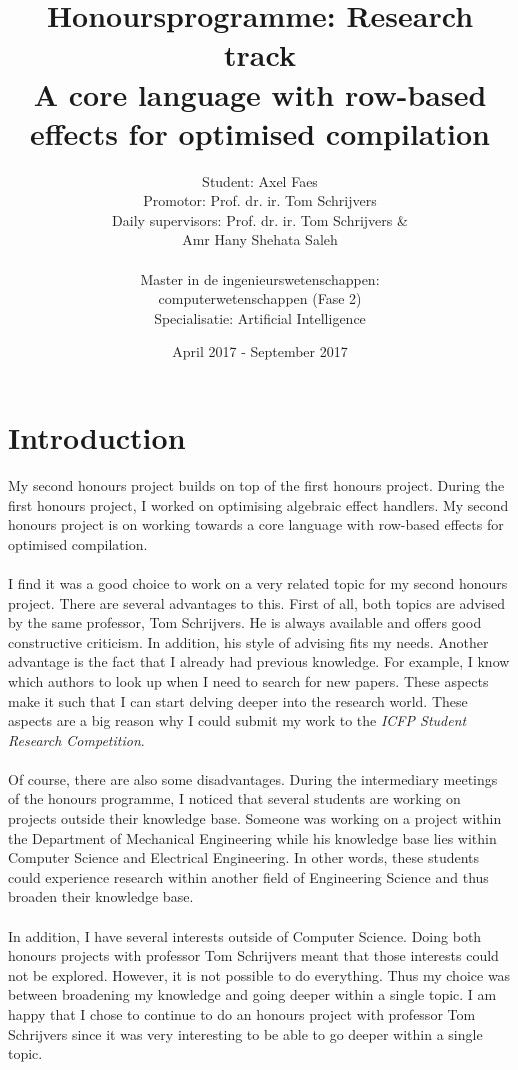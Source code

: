 \documentclass[notitlepage]{article}
\title{\vspace{-2cm}Honoursprogramme: Research track \\\mbox{}{A core language with row-based effects for optimised compilation}}
\author{Student: Axel Faes\\{ Promotor: Prof. dr. ir. Tom Schrijvers}\\{Daily supervisors:  Prof. dr. ir. Tom Schrijvers \&\\ Amr Hany Shehata Saleh}\\\mbox{}\\{Master in de ingenieurswetenschappen: \\computerwetenschappen (Fase 2)}\\{Specialisatie: Artificial Intelligence}}
\date{April 2017 - September 2017}
\begin{document}
\maketitle

\section{Introduction}
My second honours project builds on top of the first honours project. During the first honours project, I worked on optimising algebraic effect handlers. My second honours project is on working towards a core language with row-based effects for optimised compilation. \\
\\
I find it was a good choice to work on a very related topic for my second honours project. There are several advantages to this. First of all, both topics are advised by the same professor, Tom Schrijvers. He is always available and offers good constructive criticism. In addition, his style of advising fits my needs. Another advantage is the fact that I already had previous knowledge. For example, I know which authors to look up when I need to search for new papers. These aspects make it such that I can start delving deeper into the research world. These aspects are a big reason why I could submit my work to the \textit{ICFP Student Research Competition}. \\
\\
Of course, there are also some disadvantages. During the intermediary meetings of the honours programme, I noticed that several students are working on projects outside their knowledge base. Someone was working on a project within the Department of Mechanical Engineering while his knowledge base lies within Computer Science and Electrical Engineering. In other words, these students could experience research within another field of Engineering Science and thus broaden their knowledge base. \\
\\
In addition, I have several interests outside of Computer Science. Doing both honours projects with professor Tom Schrijvers meant that those interests could not be explored. However, it is not possible to do everything. Thus my choice was between broadening my knowledge and going deeper within a single topic. I am happy that I chose to continue to do an honours project with professor Tom Schrijvers since it was very interesting to be able to go deeper within a single topic.
\end{document}
